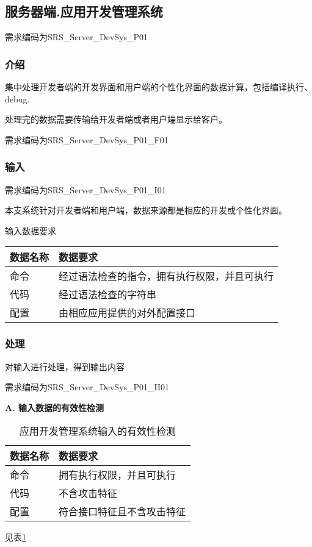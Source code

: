 {\color{red}

\subsection{服务器端.应用开发管理系统}

需求编码为SRS\_Server\_DevSys\_P01
\subsubsection{介绍}
集中处理开发者端的开发界面和用户端的个性化界面的数据计算，包括编译执行、debug.

处理完的数据需要传输给开发者端或者用户端显示给客户。

需求编码为SRS\_Server\_DevSys\_P01\_F01
\subsubsection{输入}

需求编码为SRS\_Server\_DevSys\_P01\_I01

本支系统针对开发者端和用户端，数据来源都是相应的开发或个性化界面。

输入数据要求

\begin{longtable}[]{@{}ll@{}}
\toprule
数据名称 & 数据要求\tabularnewline
\midrule
\endhead
命令 & 经过语法检查的指令，拥有执行权限，并且可执行\tabularnewline
代码 &
经过语法检查的字符串\tabularnewline
配置 & 由相应应用提供的对外配置接口 \tabularnewline
\bottomrule
\end{longtable}


\subsubsection{处理}

对输入进行处理，得到输出内容

需求编码为SRS\_Server\_DevSys\_P01\_H01

\textbf{A. 输入数据的有效性检测}

\begin{longtable}[]{@{}ll@{}}
\caption{应用开发管理系统输入的有效性检测}\label{tab:concrete_DevSyS_input_valid}\\
\toprule
数据名称 & 数据要求\tabularnewline
\midrule
\endhead
命令 & 拥有执行权限，并且可执行\tabularnewline
代码 & 不含攻击特征 \tabularnewline
配置 & 符合接口特征且不含攻击特征 \tabularnewline
\bottomrule
\end{longtable}

见表\ref{tab:concrete_DevSyS_input_valid}

}
